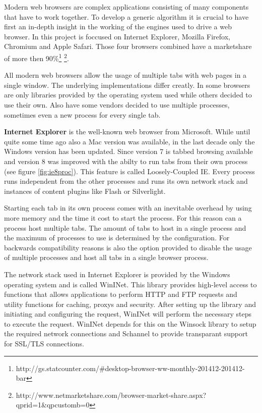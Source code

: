 
Modern web browsers are complex applications consisting of many components that have to work together. To develop a generic algorithm it is crucial to have first an in-depth insight in the working of the engines used to drive a web browser. In this project is foccused on Internet Explorer, Mozilla Firefox, Chromium and Apple Safari. Those four browsers combined have a marketshare of more then 90\%\footnote{http://gs.statcounter.com/\#desktop-browser-ww-monthly-201412-201412-bar} \footnote{http://www.netmarketshare.com/browser-market-share.aspx?qprid=1\&qpcustomb=0}.

All modern web browsers allow the usage of multiple tabs with web pages in a single window. The underlying implementations differ creatly. In some browsers are only libraries provided by the operating system used while others decided to use their own. Also have some vendors decided to use multiple processes, sometimes even a new process for every single tab.

\textbf{Internet Explorer} is the well-known web browser from Microsoft. While until quite some time ago also a Mac version was available, in the last decade only the Windows version has been updated. Since version 7 is tabbed browsing available and version 8 was improved with the abilty to run tabs from their own process (see figure \ref{fig:ie8proc}). This feature is called Loosely-Coupled IE\cite{http://blogs.msdn.com/b/ie/archive/2008/03/11/ie8-and-loosely-coupled-ie-lcie.aspx}. Every process runs independent from the other processes and runs its own network stack and instances of content plugins like Flash or Silverlight.

Starting each tab in its own process comes with an inevitable overhead by using more memory and the time it cost to start the process. For this reason can a process host multiple tabs. The amount of tabs to host in a single process and the maximum of processes to use is determined by the configuration. For backwards compatibility reasons is also the option provided to disable the usage of multiple processes and host all tabs in a single browser process.

The network stack used in Internet Explorer is provided by the Windows operating system and is called WinINet. This library provides high-level access to functions that allows applications to perform HTTP and FTP requests and utility functions for caching, proxys and security. After setting up the library and initiating and configuring the request, WinINet will perform the necessary steps to execute the request. WinINet depends for this on the Winsock library to setup the required network connections and Schannel to provide transparant support for SSL/TLS connections.

